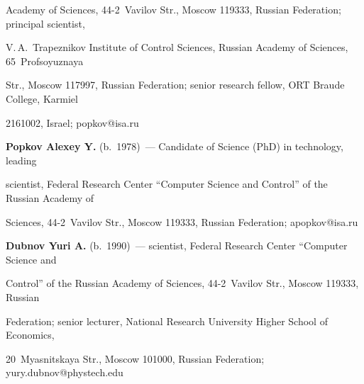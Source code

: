 Academy of Sciences, 44-2~Vavilov Str., Moscow 119333, Russian Federation; principal scientist, 


V.\,A.~Trapeznikov Institute of Control Sciences, Russian Academy of Sciences, 65~Profsoyuznaya 


Str., Moscow 117997, Russian Federation; senior research fellow, ORT Braude College, Karmiel 


2161002, Israel; \mbox{popkov@isa.ru}





\vspace*{3pt}





\noindent


\textbf{Popkov Alexey Y.} (b.\ 1978)~--- Candidate of Science (PhD) in technology, leading 


scientist, Federal Research Center ``Computer Science and Control'' of the Russian Academy of 


Sciences, 44-2~Vavilov Str., Moscow 119333, Russian Federation; \mbox{apopkov@isa.ru}





\vspace*{3pt}





\noindent


\textbf{Dubnov Yuri A.} (b.\ 1990)~--- scientist, Federal Research Center ``Computer Science and 


Control'' of the Russian Academy of Sciences, 44-2~Vavilov Str., Moscow 119333, Russian 


Federation; senior lecturer, National Research University Higher School of Economics, 


20~Myasnitskaya Str., Moscow 101000, Russian Federation; \mbox{yury.dubnov@phystech.edu}





\label{end\stat}





\renewcommand{\bibname}{\protect\rm Литература} 



